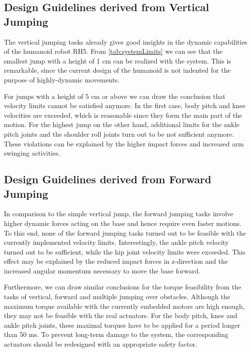 \subsection{Design Guidelines derived from Vertical Jumping}
The vertical jumping tasks already gives good insights in the dynamic capabilities of the humanoid robot RH5. From \cref{tab:systemLimits} we can see that the smallest jump with a height of 1 cm can be realized with the system. This is remarkable, since the current design of the humanoid is not indented for the purpose of highly-dynamic movements. 

For jumps with a height of 5 cm or above we can draw the conclusion that velocity limits cannot be satisfied anymore. In the first case, body pitch and knee velocities are exceeded, which is reasonable since they form the main part of the motion. For the highest jump on the other hand, additional limits for the ankle pitch joints and the shoulder roll joints turn out to be not sufficient anymore. These violations can be explained by the higher impact forces and increased arm swinging activities. 

\subsection{Design Guidelines derived from Forward Jumping}
In comparison to the simple vertical jump, the forward jumping tasks involve higher dynamic forces acting on the base and hence require even faster motions. To this end, none of the forward jumping tasks turned out to be feasible with the currently implemented velocity limits. Interestingly, the ankle pitch velocity turned out to be sufficient, while the hip joint velocity limits were exceeded. This effect may be explained by the reduced impact forces in z-direction and the increased angular momentum necessary to move the base forward. 

Furthermore, we can draw similar conclusions for the torque feasibility from the tasks of vertical, forward and multiple jumping over obstacles. Although the maximum torque available with the currently embedded motors are high enough, they may not be feasible with the real actuators. For the body pitch, knee and ankle pitch joints, these maximal torques have to be applied for a period longer than 50 \nolinebreak ms. To prevent long-term damage to the system, the corresponding actuators should be redesigned with an appropriate safety factor. 